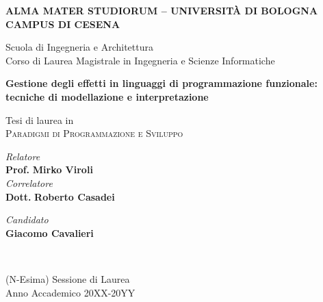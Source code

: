 \begin{titlepage}
	\begin{center}
		\large
		\textbf{ALMA MATER STUDIORUM -- UNIVERSITÀ DI BOLOGNA \\ CAMPUS DI CESENA}
		\\
		\noindent\hrulefill
		\vspace{0.4cm}

		\Large
		Scuola di Ingegneria e Architettura \\
		Corso di Laurea Magistrale in Ingegneria e Scienze Informatiche

		\Huge
		\vspace{4cm}
		\textbf{Gestione degli effetti in linguaggi di programmazione funzionale: tecniche di modellazione e interpretazione}

		\large
		\vspace{1cm}
		Tesi di laurea in
		\\
		\textsc{Paradigmi di Programmazione e Sviluppo}

		\vspace{5.5cm}
		\begin{minipage}[t]{0.64\textwidth}
			\begin{flushleft}
				\textit{Relatore}
				\\
				\textbf{Prof.} \textbf{Mirko Viroli}
				\\
				\vspace{0.4cm}
				\textit{Correlatore}
				\\
				\textbf{Dott.} \textbf{Roberto Casadei}
			\end{flushleft}
		\end{minipage}
		\begin{minipage}[t]{0.34\textwidth}
			\begin{flushright}
				\textit{Candidato}
				\\
				\textbf{Giacomo Cavalieri}
			\end{flushright}
		\end{minipage}\\

		\vfill
		\noindent\hrulefill
		\vspace{0.3cm}
		\Large

		(N-Esima) Sessione di Laurea
		\\
		Anno Accademico 20XX-20YY
	\end{center}
\end{titlepage}
\restoregeometry